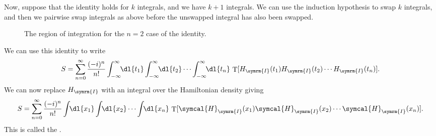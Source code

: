\documentclass[fleqn]{NotesClass}
\newcommand{\hamiltonianDensity}{\symcal{H}}
\newcommand{\interaction}{\symrm{I}}
\DeclareMathOperator{\timeOrdering}{T}
\begin{document}
    Now, suppose that the identity holds for \(k\) integrals, and we have \(k + 1\) integrals.
    We can use the induction hypothesis to swap \(k\) integrals, and then we pairwise swap integrals as above before the unswapped integral has also been swapped.
    
    \begin{figure}
        \caption{The region of integration for the \(n = 2\) case of the identity.}
    \end{figure}
    
    We can use this identity to write
    \begin{equation}
        S = \sum_{n = 0}^{\infty} \frac{(-i)^n}{n!} \int_{-\infty}^{\infty} \!\! \dl{t_1} \int_{-\infty}^{\infty} \!\! \dl{t_2} \dotsm \int_{-\infty}^{\infty} \!\! \dl{t_n} \, \timeOrdering[H_{\interaction}(t_1) H_{\interaction}(t_2) \dotsm H_{\interaction}(t_n)].
    \end{equation}
    We can now replace \(H_{\interaction}\) with an integral over the Hamiltonian density giving
    \begin{equation}
        S = \sum_{n = 0}^{\infty} \frac{(-i)^n}{n!} \int \!\! \dl{x_1} \int \!\! \dl{x_2} \dotsm \int \!\! \dl{x_n} \, \timeOrdering[\hamiltonianDensity_{\interaction}(x_1) \hamiltonianDensity_{\interaction}(x_2) \dotsm \hamiltonianDensity_{\interaction}(x_n)].
    \end{equation}
    This is called the .
    
\end{document}
